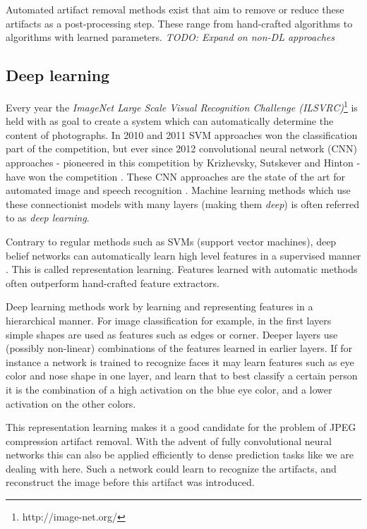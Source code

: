 Automated artifact removal methods exist that aim to remove or reduce these artifacts as a post-processing step. These range from hand-crafted algorithms to algorithms with learned parameters. \textit{TODO: Expand on non-DL approaches}

\subsection{Deep learning}

Every year the \emph{ImageNet Large Scale Visual Recognition Challenge (ILSVRC)}\footnote{http://image-net.org/} \cite{ILSVRC15} is held with as goal to create a system which can automatically determine the content of photographs. In 2010 and 2011 SVM approaches won the classification part of the competition, but ever since 2012 convolutional neural network (CNN) approaches - pioneered in this competition by Krizhevsky, Sutskever and Hinton - have won the competition \cite{alexnet}. These CNN approaches are the state of the art for automated image and speech recognition \cite{guodeep}\cite{abdelspeech}. Machine learning methods which use these connectionist models with many layers (making them \emph{deep}) is often referred to as \emph{deep learning}.

Contrary to regular methods such as SVMs (support vector machines), deep belief networks can automatically learn high level features in a supervised manner \cite{dlbook}. This is called representation learning. Features learned with automatic methods often outperform hand-crafted feature extractors. 

\bigskip

Deep learning methods work by learning and representing features in a hierarchical manner. For image classification for example, in the first layers simple shapes are used as features such as edges or corner. Deeper layers use (possibly non-linear) combinations of the features learned in earlier layers. If for instance a network is trained to recognize faces it may learn features such as eye color and nose shape in one layer, and learn that to best classify a certain person it is the combination of a high activation on the blue eye color, and a lower activation on the other colors.

\bigskip

This representation learning makes it a good candidate for the problem of JPEG compression artifact removal. With the advent of fully convolutional neural networks this can also be applied efficiently to dense prediction tasks like we are dealing with here\cite{long2015fully}. Such a network could learn to recognize the artifacts, and reconstruct the image before this artifact was introduced.

